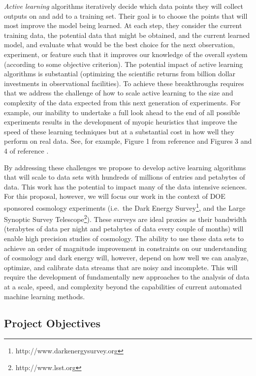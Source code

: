 \documentclass[prd,nofootbib,floatfix,11pt,tightenlines,nofootinbib]{revtex4}
\begin{document}
{\it Active learning} algorithms iteratively decide which data
points they will collect outputs on and add to a training set.  Their
goal is to choose the points that will most improve the model being
learned.  At each step, they consider the current training data, the
potential data that might be obtained, and the current learned model,
and evaluate what would be the best choice for the next observation,
experiment, or feature such that it improves our knowledge of the
overall system (according to some objective criterion). The potential
impact of active learning algorithms is substantial (optimizing the
scientific returns from billion dollar investments in observational
facilities). To achieve these breakthroughs requires that we address
the challenge of how to scale active learning to the size and
complexity of the data expected from this next generation of
experiments.  For example, our inability to undertake a full look
ahead to the end of all possible experiments results in the
development of myopic heuristics that improve the speed of these
learning techniques but at a substantial cost in how well they perform
on real data.  See, for example, 
Figure 1 from reference \cite{Garnett11} and Figures
3 and 4 of reference \cite{Garnett12}.

By addressing these challenges we propose to develop active learning
algorithms that will scale to data sets with hundreds of millions of
entries and petabytes of data. This work has the potential to impact
many of the data intensive sciences. For this proposal, however, we
will focus our work in the context of DOE sponsored cosmology
experiments (i.e.\ the Dark Energy
Survey\footnote{http://www.darkenergysurvey.org}, and the Large
Synoptic Survey Telescope\footnote{http://www.lsst.org}). These
surveys are ideal proxies as their bandwidth (terabytes of data per
night and petabytes of data every couple of months) will enable high
precision studies of cosmology. The ability to use these data sets to
achieve an order of magnitude improvement in constraints on our
understanding of cosmology and dark energy will, however, depend on
how well we can analyze, optimize, and calibrate data streams that are
noisy and incomplete. This will require the development of
fundamentally new approaches to the analysis of data at a scale,
speed, and complexity beyond the capabilities of current automated
machine learning methods.

\subsection{Project Objectives}
\label{sec:objectives}
\end{document}
